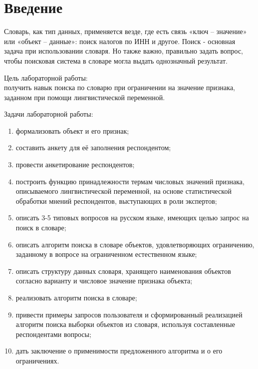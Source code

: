 \section*{\large Введение}

\par Словарь, как тип данных, применяется везде, где есть связь «ключ -- значение» или «объект -- данные»: поиск налогов по ИНН и другое. Поиск - основная задача при использовании словаря. Но также важно, правильно задать вопрос, чтобы поисковая система в словаре могла выдать однозначный результат.

	Цель лабораторной работы:\\
	получить навык поиска по словарю при ограничении на значение признака, заданном при помощи лингвистической переменной.

	Задачи лабораторной работы:
	\begin{enumerate}
		\item формализовать объект и его признак;
		\item составить анкету для её заполнения респондентом;
		\item провести анкетирование респондентов;
		\item построить функцию принадлежности термам числовых значений признака, описываемого лингвистической переменной, на основе статистической обработки мнений респондентов, выступающих в роли экспертов;
		\item описать 3-5 типовых вопросов на русском языке, имеющих целью запрос на поиск в словаре;
		\item описать алгоритм поиска в словаре объектов, удовлетворяющих ограничению, заданному в вопросе на ограниченном естественном языке;
		\item описать структуру данных словаря, хранящего наименования объектов согласно варианту и числовое значение признака объекта;
		\item реализовать алгоритм поиска в словаре;
		\item привести примеры запросов пользователя и сформированный реализацией алгоритм поиска выборки объектов из словаря, используя составленные респондентами вопросы;
		\item дать заключение о применимости предложенного алгоритма и о его ограничениях.
	\end{enumerate}

\newpage